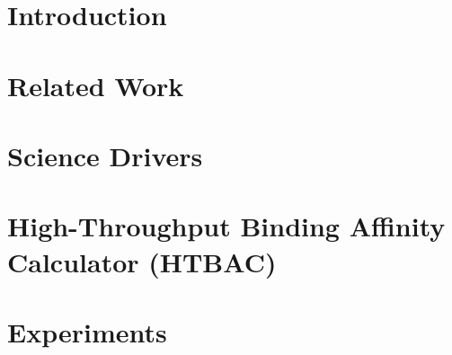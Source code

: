 \documentclass[conference]{IEEEtran}
\begin{document}
\section{Introduction}\label{sec:intro}



\section{Related Work}\label{sec:related-work}



\section{Science Drivers}\label{sec:science-drivers}




\section{High-Throughput Binding Affinity Calculator
(HTBAC)}\label{sec:htbac}



% 


\section{Experiments}\label{sec:experiments}

\end{document}
